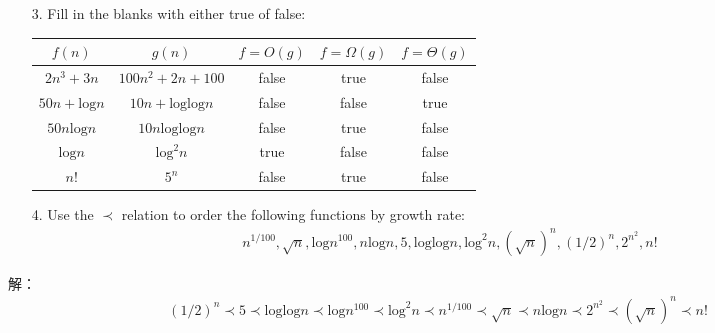 \documentclass{article}
\begin{document}
\begin{itemize}
\item[3.] Fill in the blanks with either true of false:
\begin{table}[h!]
  \begin{center}
    \begin{tabular}{|c|c|c|c|c|} 
    \hline
    $f(n)$ & $g(n)$ & $f=O(g) $ &$f=\Omega(g)$  &$f=\Theta(g)$ \\
    \hline\hline
    $2n^3+3n$ & $100n^2 + 2n +100$ & false & true&false \\\hline
    $50n + \mbox{log}n $ & $10n+\mbox{log}\mbox{log}n$ &false &false&true \\\hline
    $50n\mbox{log}n$ & $10n\mbox{log}\mbox{log}n$ &  false & true&false\\\hline
    $\mbox{log}n$ & $\mbox{log}^2n$ & true & false&false \\\hline
    $n!$ & $5^n$ &  false & true&false\\
    \hline
    \end{tabular}
  \end{center}
\end{table}


\item[4.] Use the $\prec$ relation to order the following functions by growth rate:
\begin{eqnarray}
n^{1/100}, \sqrt{n}, \mbox{log} n^{100}, n \mbox{log} n, 5, \mbox{log} \mbox{log} n, \mbox{log}^2n,(\sqrt{n})^n, (1/2)^n, 2^{n^2}, n! \nonumber 
\end{eqnarray}
\end{itemize}
解：
\begin{eqnarray}
(1/2)^n \prec 5 \prec \mbox{log} \mbox{log} n \prec \mbox{log} n^{100} \prec \mbox{log}^2n \prec n^{1/100} \prec \sqrt{n} \prec n \mbox{log} n \prec 2^{n^2} \prec (\sqrt{n})^n \prec n! \nonumber
\end{eqnarray}
\end{document}
